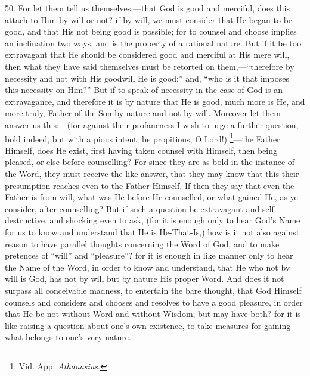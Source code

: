 50. For let them tell us
themselves,—that God is good and merciful, does this attach to Him
by will or not? if by will, we must consider that He began to be good,
and that His not being good is possible; for to counsel and choose
implies an inclination two ways, and is the property of a rational
nature. But if it be too extravagant that He should be considered good
and merciful at His mere will, then what they have said themselves
must be retorted on them,—``therefore by necessity and not with His
goodwill He is good;'' and, ``who is it that imposes this necessity on
Him?'' But if to speak of necessity in the case of God is an
extravagance, and therefore it is by nature that He is good, much more
is He, and more truly, Father of the Son by nature and not by will.
Moreover let them answer us this:—(for against their profaneness I
wish to urge a further question, bold indeed, but with a pious intent;
be propitious, O Lord!) \footnote{Vid. App. \emph{Athanasius}.}—the
Father Himself, does He exist, first having taken counsel with
Himself, then being pleased, or else before counselling? For since
they are as bold in the instance of the Word, they must receive the
like answer, that they may know that this their presumption reaches
even to the Father Himself. If then they say that even the Father is
from will, what was He before He counselled, or what gained He, as ye
consider, after counselling? But if such a question be extravagant and
self-destructive, and shocking even to ask, (for it is enough only to
hear God's Name for us to know and understand that He is He-That-Is,)
how is it not also against reason to have parallel thoughts concerning
the Word of God, and to make pretences of ``will'' and ``pleasure''?
for it is enough in like manner only to hear the Name of the Word, in
order to know and understand, that He who not by will is God, has not
by will but by nature His proper Word. And does it not surpass all
conceivable madness, to entertain the bare thought, that God Himself
counsels and considers and chooses and resolves to have a good
pleasure, in order that He be not without Word and without Wisdom, but
may have both? for it is like raising a question about one's own
existence, to take measures for gaining what belongs to one's very
nature.

